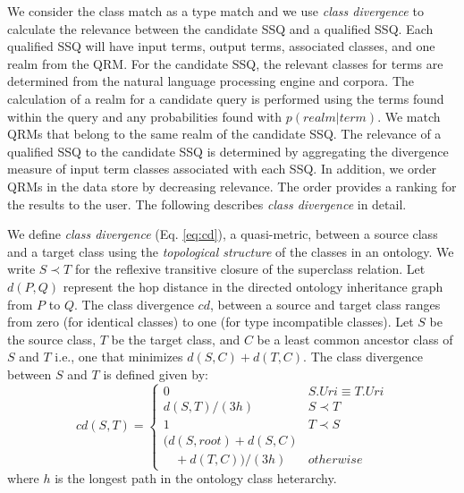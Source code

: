 We consider the class match as a type match and we use \emph{class divergence} to calculate the relevance between the candidate SSQ and a qualified SSQ. Each qualified SSQ will have input terms, output terms, associated classes, and one realm from the QRM.  For the candidate SSQ, the relevant classes for terms are determined from the natural language processing engine and corpora. The calculation of a realm for a candidate query is performed using the terms found within the query and any probabilities found with $p(realm|term)$. %
We match QRMs that belong to the same realm of the candidate SSQ. The relevance of a qualified SSQ to the candidate SSQ is determined by aggregating the divergence measure of input term classes associated with each SSQ. In addition, we order QRMs in the data store by decreasing relevance. The order provides a ranking for the results to the user. The following describes \emph{class divergence} in detail.


We define \textit{class divergence} (Eq. \ref{eq:cd}), a quasi-metric, between a source class and a target class using the \textit{topological structure} of the classes in an ontology. We write $S \prec T$ for the reflexive transitive closure of the superclass relation. Let $d(P,Q)$ represent the hop distance in the directed ontology inheritance graph from $P$ to $Q$. The class divergence $cd$, between a source and target class ranges from zero (for identical classes) to one (for type incompatible classes). Let $S$ be the source class, $T$ be the target class, and $C$ be a least common ancestor class of $S$ and $T$ i.e., one that minimizes $d(S,C) + d(T,C)$. The class divergence between $S$ and $T$ is defined given by:
\begin{equation}
\label{eq:cd}
cd(S, T) = \begin{cases}
0 & S.{Uri} \equiv T.{Uri}\\
d(S, T)/(3h) & S \prec T\\
1 & T \prec S\\
(d(S,root) + d(S,C) \\ \ \ \ \ + d(T,C))/(3h) & otherwise
\end{cases}
\end{equation}
where $h$ is the longest path in the ontology class heterarchy.

